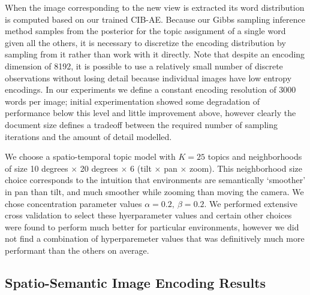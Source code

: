 When the image corresponding to the new view is extracted its word distribution is computed based on our trained CIB-AE. Because our Gibbs sampling inference method samples from the posterior for the topic assignment of a single word given all the others, it is necessary to discretize the encoding distribution by sampling from it rather than work with it directly. Note that despite an encoding dimension of 8192, it is possible to use a relatively small number of discrete observations without losing detail because individual images have low entropy encodings. In our experiments we define a constant encoding resolution of 3000 words per image; initial experimentation showed some degradation of performance below this level and little improvement above, however clearly the document size defines a tradeoff between the required number of sampling iterations and the amount of detail modelled.

We choose a spatio-temporal topic model with $K = 25$ topics and neighborhoods of size 10 degrees $\times$ 20 degrees $\times$ 6 (tilt $\times$ pan $\times$ zoom). This neighborhood size choice corresponds to the intuition that environments are semantically `smoother' in pan than tilt, and much smoother while zooming than moving the camera. We chose concentration parameter values $\alpha = 0.2,~\beta = 0.2$. We performed extensive cross validation to select these hyerparameter values and certain other choices were found to perform much better for particular environments, however we did not find a combination of hyperparemeter values that was definitively much more performant than the others on average.

\subsection{Spatio-Semantic Image Encoding Results}

